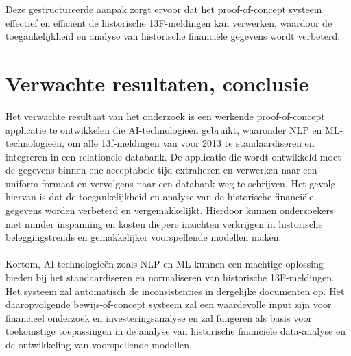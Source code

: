 Deze gestructureerde aanpak zorgt ervoor dat het proof-of-concept systeem effectief en efficiënt de historische 13F-meldingen kan verwerken, waardoor de toegankelijkheid en analyse van historische financiële gegevens wordt verbeterd.



\section{Verwachte resultaten, conclusie}%
\label{sec:verwachte_resultaten}


Het verwachte resultaat van het onderzoek is een werkende proof-of-concept applicatie te ontwikkelen die AI-technologieën gebruikt, waaronder NLP en ML- technologieën, om alle 13f-meldingen van voor 2013 te standaardiseren en integreren in een relationele databank. De applicatie die wordt ontwikkeld moet de gegevens binnen ene acceptabele tijd extraheren en verwerken naar een uniform formaat en vervolgens naar een databank weg te schrijven.  Het gevolg hiervan is dat de toegankelijkheid en analyse van de historische financiële gegevens worden verbeterd en vergemakkelijkt. Hierdoor kunnen onderzoekers met minder inspanning en kosten diepere inzichten verkrijgen in historische beleggingstrends en gemakkelijker voorspellende modellen maken. 
\\
\\
Kortom, AI-technologieën zoals NLP en ML kunnen een machtige oplossing bieden bij het standaardiseren en normaliseren van historische 13F-meldingen. Het systeem zal automatisch de inconsistenties in dergelijke documenten op. Het daaropvolgende bewijs-of-concept systeem zal een waardevolle input zijn voor financieel onderzoek en investeringsanalyse en zal fungeren als basis voor toekomstige toepassingen in de analyse van historische financiële data-analyse en de ontwikkeling van voorspellende modellen.
